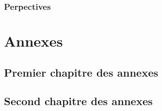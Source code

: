 \documentclass[french]{spimutbmphdthesis}
\begin{document}
\section{Perpectives}
 
\backmatter
 
 
 
 
 
 
 
 
 

%
 

 
 
\listoffigures
 
\listoftables
 
\listofdefinitions

\appendix
\part{Annexes}
 
\chapter{Premier chapitre des annexes}

\chapter{Second chapitre des annexes}
 
\end{document}
